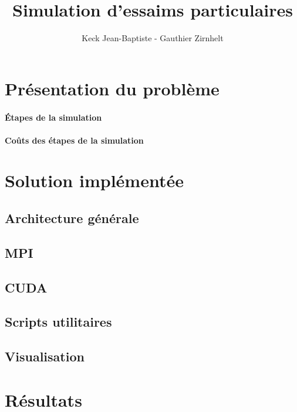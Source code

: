 \documentclass[12pt,a4paper,sans]{article}
\title{Simulation d'essaims particulaires}
\author{Keck Jean-Baptiste - Gauthier Zirnhelt}
\begin{document}
\maketitle

\section{Présentation du problème}
\paragraph{Étapes de la simulation}
\paragraph{Coûts des étapes de la simulation}

\section{Solution implémentée}
\subsection{Architecture générale}
\subsection{MPI}
\subsection{CUDA}
\subsection{Scripts utilitaires}
\subsection{Visualisation}

\section{Résultats}
\end{document}
